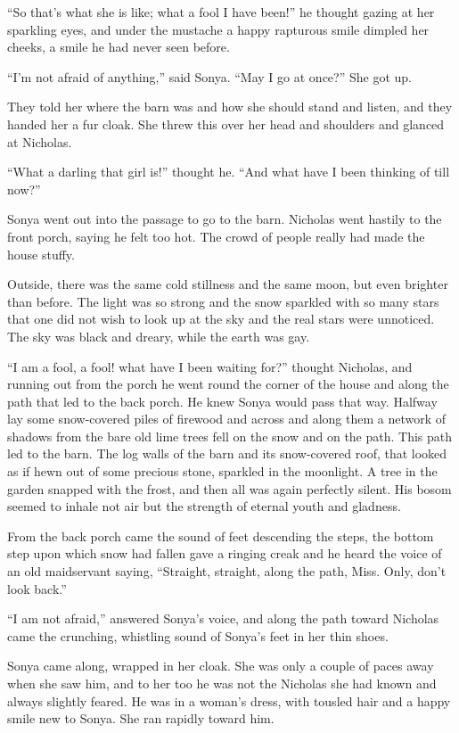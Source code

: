 ``So that's what she is like; what a fool I have been!'' he
thought gazing at her sparkling eyes, and under the mustache a
happy rapturous smile dimpled her cheeks, a smile he had never
seen before.

``I'm not afraid of anything,'' said Sonya. ``May I go at once?''
She got up.

They told her where the barn was and how she should stand and
listen, and they handed her a fur cloak. She threw this over her
head and shoulders and glanced at Nicholas.

``What a darling that girl is!'' thought he. ``And what have I
been thinking of till now?''

Sonya went out into the passage to go to the barn. Nicholas went
hastily to the front porch, saying he felt too hot. The crowd of
people really had made the house stuffy.

Outside, there was the same cold stillness and the same moon, but
even brighter than before. The light was so strong and the snow
sparkled with so many stars that one did not wish to look up at
the sky and the real stars were unnoticed. The sky was black and
dreary, while the earth was gay.

``I am a fool, a fool! what have I been waiting for?'' thought
Nicholas, and running out from the porch he went round the corner
of the house and along the path that led to the back porch. He
knew Sonya would pass that way. Halfway lay some snow-covered
piles of firewood and across and along them a network of shadows
from the bare old lime trees fell on the snow and on the
path. This path led to the barn. The log walls of the barn and
its snow-covered roof, that looked as if hewn out of some
precious stone, sparkled in the moonlight. A tree in the garden
snapped with the frost, and then all was again perfectly
silent. His bosom seemed to inhale not air but the strength of
eternal youth and gladness.

From the back porch came the sound of feet descending the steps,
the bottom step upon which snow had fallen gave a ringing creak
and he heard the voice of an old maidservant saying, ``Straight,
straight, along the path, Miss. Only, don't look back.''

``I am not afraid,'' answered Sonya's voice, and along the path
toward Nicholas came the crunching, whistling sound of Sonya's
feet in her thin shoes.

Sonya came along, wrapped in her cloak. She was only a couple of
paces away when she saw him, and to her too he was not the
Nicholas she had known and always slightly feared. He was in a
woman's dress, with tousled hair and a happy smile new to
Sonya. She ran rapidly toward him.

